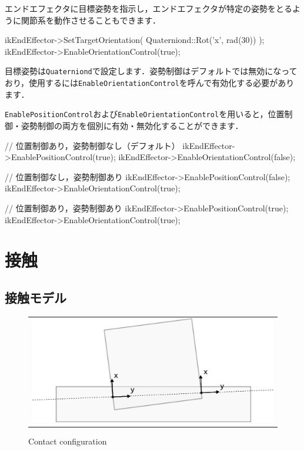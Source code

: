 \KLUDGE エンドエフェクタに目標姿勢を指示し，エンドエフェクタが特定の姿勢をとるように関節系を動作させることもできます．
\begin{sourcecode}
ikEndEffector->SetTargetOrientation( Quaterniond::Rot('x', rad(30)) ); 
ikEndEffector->EnableOrientationControl(true);
\end{sourcecode}
\KLUDGE 目標姿勢は\texttt{Quaterniond}\KLUDGE で設定します．姿勢制御はデフォルトでは無効になっており，使用するには\texttt{EnableOrientationControl}\KLUDGE を呼んで有効化する必要があります．

\texttt{EnablePositionControl}\KLUDGE および\texttt{EnableOrientationControl}\KLUDGE を用いると，位置制御・姿勢制御の両方を個別に有効・無効化することができます．
\begin{sourcecode}
// 位置制御あり，姿勢制御なし（デフォルト）
ikEndEffector->EnablePositionControl(true);
ikEndEffector->EnableOrientationControl(false);
\end{sourcecode}

\begin{sourcecode}
// 位置制御なし，姿勢制御あり
ikEndEffector->EnablePositionControl(false);
ikEndEffector->EnableOrientationControl(true);
\end{sourcecode}

\begin{sourcecode}
// 位置制御あり，姿勢制御あり
ikEndEffector->EnablePositionControl(true);
ikEndEffector->EnableOrientationControl(true);
\end{sourcecode}



\section{\KLUDGE 接触}
\label{sec_physics_contact}


\subsection*{\KLUDGE 接触モデル}

\begin{figure}[t]
\begin{center}
\begin{tabular}{c}
\includegraphics[clip, width=.7\hsize]{fig/phcontact.eps} \\
\end{tabular}
\end{center}
\caption{Contact configuration}
\label{fig_physics_contact}
\end{figure}

